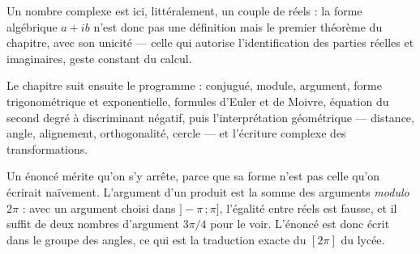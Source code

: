 Un nombre complexe est ici, littéralement, un couple de réels : la forme algébrique $a + ib$
n'est donc pas une définition mais le premier théorème du chapitre, avec son unicité — celle
qui autorise l'identification des parties réelles et imaginaires, geste constant du calcul.

Le chapitre suit ensuite le programme : conjugué, module, argument, forme trigonométrique et
exponentielle, formules d'Euler et de Moivre, équation du second degré à discriminant négatif,
puis l'interprétation géométrique — distance, angle, alignement, orthogonalité, cercle — et
l'écriture complexe des transformations.

Un énoncé mérite qu'on s'y arrête, parce que sa forme n'est pas celle qu'on écrirait
naïvement. L'argument d'un produit est la somme des arguments \emph{modulo} $2\pi$ : avec un
argument choisi dans $]-\pi\,;\pi]$, l'égalité entre réels est fausse, et il suffit de deux
nombres d'argument $3\pi/4$ pour le voir. L'énoncé est donc écrit dans le groupe des angles,
ce qui est la traduction exacte du \og{} $[2\pi]$ \fg{} du lycée.
